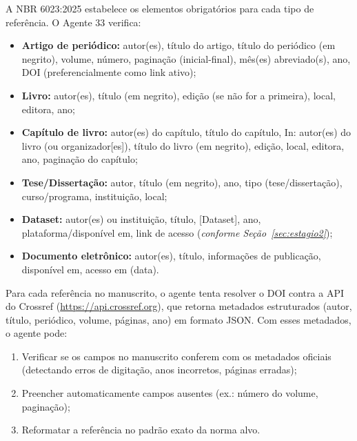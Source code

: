 A NBR 6023:2025 \cite{ABNT6023_2025} estabelece os elementos
obrigatórios para cada tipo de referência. O Agente 33 verifica:

\begin{itemize}
    \item \textbf{Artigo de periódico:} autor(es), título do
    artigo, título do periódico (em negrito), volume, número,
    paginação (inicial-final), mês(es) abreviado(s), ano, DOI
    (preferencialmente como link ativo);

    \item \textbf{Livro:} autor(es), título (em negrito), edição
    (se não for a primeira), local, editora, ano;

    \item \textbf{Capítulo de livro:} autor(es) do capítulo, título
    do capítulo, In: autor(es) do livro (ou organizador[es]), título
    do livro (em negrito), edição, local, editora, ano, paginação
    do capítulo;

    \item \textbf{Tese/Dissertação:} autor, título (em negrito),
    ano, tipo (tese/dissertação), curso/programa, instituição,
    local;

    \item \textbf{Dataset:} autor(es) ou instituição, título,
    [Dataset], ano, plataforma/disponível em, link de acesso
    (\textit{conforme Seção~\ref{sec:estagio2}});

    \item \textbf{Documento eletrônico:} autor(es), título,
    informações de publicação, disponível em, acesso em (data).
\end{itemize}

Para cada referência no manuscrito, o agente tenta resolver o DOI
contra a API do Crossref (\url{https://api.crossref.org}), que
retorna metadados estruturados (autor, título, periódico, volume,
páginas, ano) em formato JSON. Com esses metadados, o agente pode:

\begin{enumerate}
    \item Verificar se os campos no manuscrito conferem com os
    metadados oficiais (detectando erros de digitação, anos
    incorretos, páginas erradas);

    \item Preencher automaticamente campos ausentes (ex.: número do
    volume, paginação);

    \item Reformatar a referência no padrão exato da norma alvo.
\end{enumerate}

